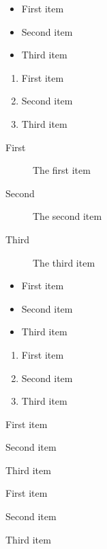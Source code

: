 
\begin{itemize}
    \item First item
    \item Second item
    \item Third item
\end{itemize}

\begin{enumerate}
    \item First item
    \item Second item
    \item Third item
\end{enumerate}

\begin{description}
    \item[First] The first item
    \item[Second] The second item
    \item[Third] The third item
\end{description}



\usepackage{enumitem}

\begin{itemize}[label=\textbullet, itemsep=1em]
    \item First item
    \item Second item
    \item Third item
\end{itemize}

\begin{enumerate}[label=\arabic*., itemsep=1em]
    \item First item
    \item Second item
    \item Third item
\end{enumerate}


\usepackage{paralist}

\begin{compactitem}
    \item First item
    \item Second item
    \item Third item
\end{compactitem}

\begin{compactenum}
    \item First item
    \item Second item
    \item Third item
\end{compactenum}
